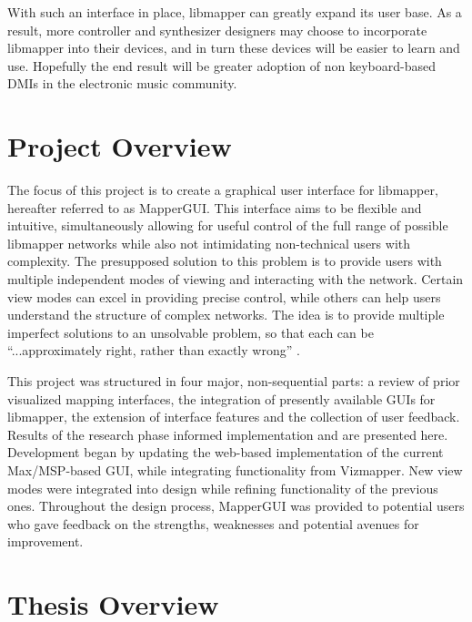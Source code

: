 With such an interface in place, libmapper can greatly expand its user base. As a result, more controller and synthesizer designers may choose to incorporate libmapper into their devices, and in turn these devices will be easier to learn and use. Hopefully the end result will be greater adoption of non keyboard-based DMIs in the electronic music community.


\section{Project Overview}

The focus of this project is to create a graphical user interface for libmapper, hereafter referred to as MapperGUI. This interface aims to be flexible and intuitive, simultaneously allowing for useful control of the full range of possible libmapper networks while also not intimidating non-technical users with complexity. The presupposed solution to this problem is to provide users with multiple independent modes of viewing and interacting with the network. Certain view modes can excel in providing precise control, while others can help users understand the structure of complex networks. The idea is to provide multiple imperfect solutions to an unsolvable problem, so that each can be ``...approximately right, rather than exactly wrong'' .

This project was structured in four major, non-sequential parts: a review of prior visualized mapping interfaces, the integration of presently available GUIs for libmapper, the extension of interface features and the collection of user feedback. Results of the research phase informed implementation and are presented here. Development began by updating the web-based implementation of the current Max/MSP-based GUI, while integrating functionality from Vizmapper. New view modes were integrated into design while refining functionality of the previous ones. Throughout the design process, MapperGUI was provided to potential users who gave feedback on the strengths, weaknesses and potential avenues for improvement.

\section{Thesis Overview}

